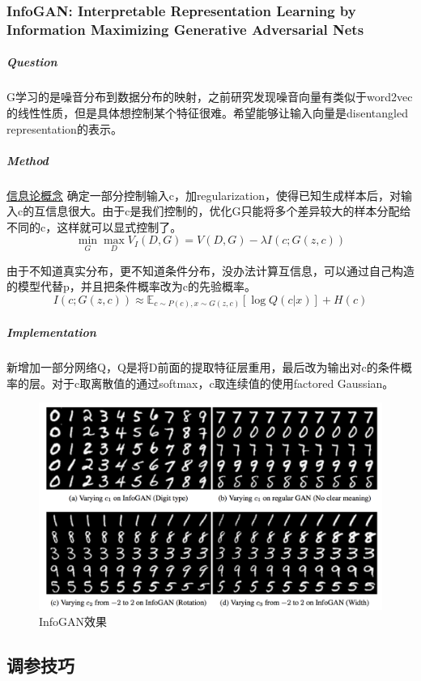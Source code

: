 \documentclass[a4paper]{article}
\begin{document}
\subsubsection{InfoGAN: Interpretable Representation Learning by Information Maximizing Generative Adversarial Nets\cite{DBLP:journals/corr/ChenDHSSA16}}

 \subparagraph{Question}
G学习的是噪音分布到数据分布的映射，之前研究发现噪音向量有类似于word2vec的线性性质，但是具体想控制某个特征很难。希望能够让输入向量是disentangled representation的表示。
\subparagraph{Method}
\href{https://sleepychord.gitbooks.io/volume1/content/xin-xi-lun-ji-chu.html}{信息论概念} 
确定一部分控制输入c，加regularization，使得已知生成样本后，对输入c的互信息很大。由于c是我们控制的，优化G只能将多个差异较大的样本分配给不同的c，这样就可以显式控制了。
$$\min\limits_G\max\limits_D V_I(D,G)=V(D,G) - \lambda I(c;G(z,c))$$

由于不知道真实分布，更不知道条件分布，没办法计算互信息，可以通过自己构造的模型代替p，并且把条件概率改为c的先验概率。
$$I(c;G(z,c))\approx \mathbb{E}_{c\sim P(c), x\sim G(z,c)}[\log Q(c|x)] + H(c)$$
\subparagraph{Implementation}
新增加一部分网络Q，Q是将D前面的提取特征层重用，最后改为输出对c的条件概率的层。对于c取离散值的通过softmax，c取连续值的使用factored Gaussian。
\begin{figure}
\centering
\includegraphics[width=\textwidth]{./img/17.png}
\caption{InfoGAN效果}
\label{fig:17}
\end{figure}
\subsection{调参技巧}
\end{document}
